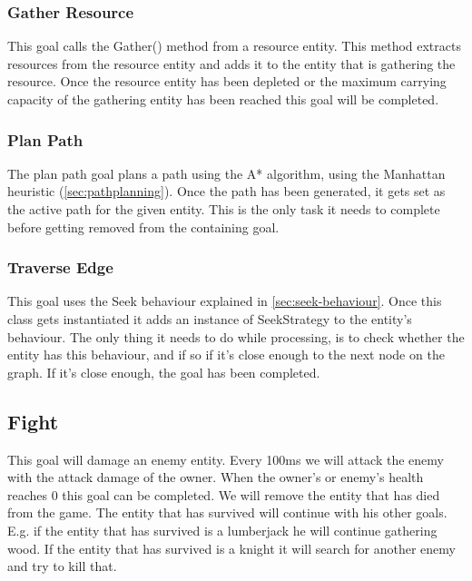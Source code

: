 \subsubsection{Gather Resource}
\label{sec:gatherresource}
This goal calls the Gather() method from a resource entity. This method extracts resources from the resource entity and adds it to the entity that is gathering the resource. Once the resource entity has been depleted or the maximum carrying capacity of the gathering entity has been reached this goal will be completed.

\subsubsection{Plan Path}
\label{sec:planpath}
The plan path goal plans a path using the A* algorithm, using the Manhattan 
heuristic (\cref{sec:pathplanning}). Once the path has been generated, it gets set as the active path 
for the given entity. This is the only task it needs to complete before 
getting removed from the containing goal.

\subsubsection{Traverse Edge}
\label{sec:traverseedge}
This goal uses the Seek behaviour explained in \cref{sec:seek-behaviour}. Once 
this class gets instantiated it adds an instance of SeekStrategy to the 
entity's behaviour. The only thing it needs to do while processing, is 
to check whether the entity has this behaviour, and if so if it's close 
enough to the next node on the graph. If it's close enough, the goal has been 
completed.

\subsection{Fight}
\label{sec:fight}
This goal will damage an enemy entity. Every 100ms we will attack the enemy with the attack damage of the owner. When the owner’s or enemy’s health reaches 0 this goal can be completed. We will remove the entity that has died from the game. The entity that has survived will continue with his other goals. E.g. if the entity that has survived is a lumberjack he will continue gathering wood. If the entity that has survived is a knight it will search for another enemy and try to kill that.

